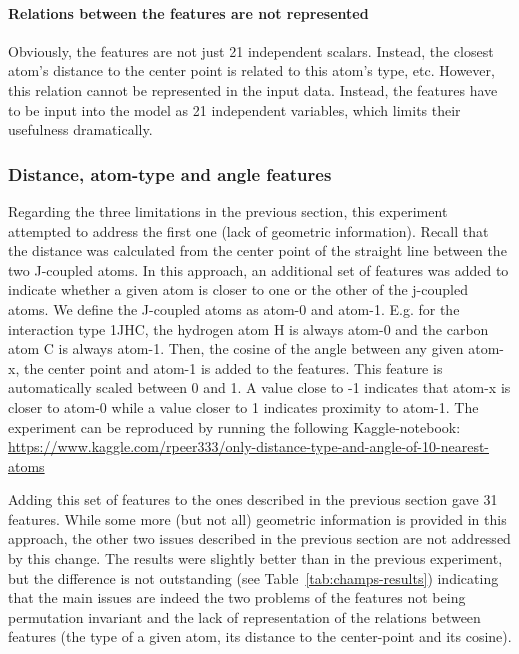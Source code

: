 \paragraph*{Relations between the features are not represented} Obviously, the features are not just 21 independent scalars. Instead, the closest atom's distance to the center point is related to this atom's type, etc. However, this relation cannot be represented in the input data. Instead, the features have to be input into the model as 21 independent variables, which limits their usefulness dramatically.


\subsubsection{Distance, atom-type and angle features}
\label{sec:dist-angle-atom-type}

Regarding the three limitations in the previous section, this experiment attempted to address the first one (lack of geometric information). Recall that the distance was calculated from the center point of the straight line between the two J-coupled atoms. In this approach, an additional set of features was added to indicate whether a given atom is closer to one or the other of the j-coupled atoms. We define the J-coupled atoms as atom-0 and atom-1. E.g. for the interaction type 1JHC, the hydrogen atom H is always atom-0 and the carbon atom C is always atom-1. Then, the cosine of the angle between any given atom-x, the center point and atom-1 is added to the features. This feature is automatically scaled between 0 and 1. A value close to -1 indicates that atom-x is closer to atom-0 while a value closer to 1 indicates proximity to atom-1. The experiment can be reproduced by running the following Kaggle-notebook:~ \url{https://www.kaggle.com/rpeer333/only-distance-type-and-angle-of-10-nearest-atoms}

Adding this set of features to the ones described in the previous section gave 31 features. While some more (but not all) geometric information is provided in this approach, the other two issues described in the previous section are not addressed by this change. The results were slightly better than in the previous experiment, but the difference is not outstanding (see Table~\ref{tab:champs-results}) indicating that the main issues are indeed the two problems of the features not being permutation invariant and the lack of representation of the relations between features (the type of a given atom, its distance to the center-point and its cosine).

